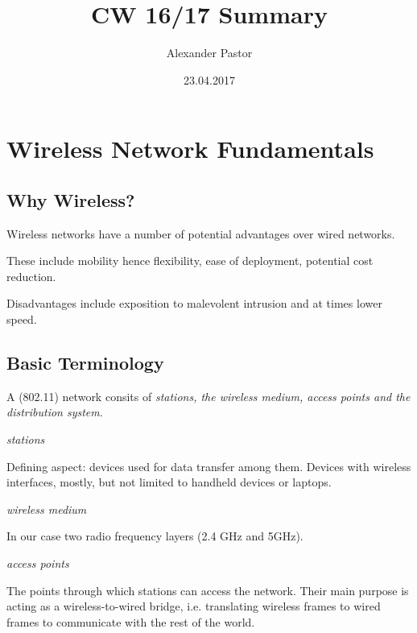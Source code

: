 \documentclass{article}
\begin{document}
	\title{CW 16/17 Summary}
	\author{Alexander Pastor}
	\date{23.04.2017}
	\maketitle
	\tableofcontents
	\newpage
	
	\section{Wireless Network Fundamentals}
	
	\subsection{Why Wireless?}
	
	Wireless networks have a number of potential advantages over wired networks.
	
	\medskip
	
	These include mobility hence flexibility, ease of deployment, potential cost reduction.
	
	\smallskip
	
	Disadvantages include exposition to malevolent intrusion and at times lower speed. 
	
	\subsection{Basic Terminology}
	
	\vskip 0.1in
	
	A (802.11) network consits of \emph{stations, the wireless medium, access points and the distribution system}.
	
	\bigskip
	
	\emph{stations} 
	
	Defining aspect: devices used for data transfer among them. Devices with wireless interfaces, mostly, but not limited to handheld devices or laptops.
	
	\bigskip
	
	\emph{wireless medium} 
	
	In our case two radio frequency layers (2.4 GHz and 5GHz).
	
	\bigskip
	
	\emph{access points} 
	
	The points through which stations can access the network. Their main purpose is acting as a wireless-to-wired bridge, i.e. translating wireless frames to wired frames to communicate with the rest of the world.
	
\end{document}
